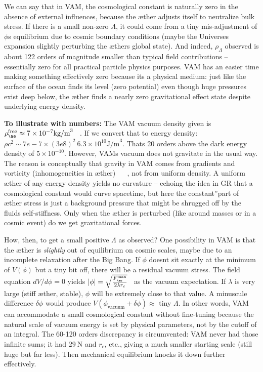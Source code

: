 \documentclass[a4paper, aps,preprint,superscriptaddress, 12pt]{revtex4}
\begin{document}
We can say that in VAM, the cosmological constant is naturally zero in the absence of external influences, because the æther adjusts itself to neutralize bulk stress. If there is a small non-zero $\Lambda$, it could come from a tiny mis-adjustment of $\phi$\rqs s equilibrium due to cosmic boundary conditions (maybe the Universe\rqs s expansion slightly perturbing the æther\rqs s global state). And indeed, $\rho_\Lambda$ observed is about 122 orders of magnitude smaller than typical field contributions – essentially zero for all practical particle physics purposes. VAM has an easier time making something effectively zero because it\rqs s a physical medium: just like the surface of the ocean finds its level (zero potential) even though huge pressures exist deep below, the æther finds a nearly zero gravitational effect state despite underlying energy density.


\textbf{To illustrate with numbers:} The VAM vacuum density given is $\rho_{\ae}^{\text{free}}\approx7\times10^{-7}\text{kg/m}^3$~\cite{VAM_constants} . If we convert that to energy density: $\rho c^2 \sim 7e-7 \times (3e8)^2 ~ 6.3\times10^{10}\text{J/m}^3$.
That\rqs s 20 orders above the dark energy density of $5\times10^{-10}$. However, VAM\rqs s vacuum does not gravitate in the usual way. The reason is conceptually that gravity in VAM comes from gradients and vorticity (inhomogeneities in æther)~\cite{Iskandarani2025c} ~\cite{Iskandarani2025c} , not from uniform density. A uniform æther of any energy density yields no curvature – echoing the idea in GR that a cosmological constant would curve spacetime, but here the \grqq constant\textquotedblright part of æther stress is just a background pressure that might be shrugged off by the fluid\rqs s self-stiffness. Only when the æther is perturbed (like around masses or in a cosmic event) do we get gravitational forces.


How, then, to get a small positive $\Lambda$ as observed? One possibility in VAM is that the æther is \textit{slightly} out of equilibrium on cosmic scales, maybe due to an incomplete relaxation after the Big Bang. If $\phi$ doesn\rqs t sit exactly at the minimum of $V(\phi)$ but a tiny bit off, there will be a residual vacuum stress. The field equation $dV/d\phi = 0$ yields $|\phi| = \sqrt{\frac{F_{\ae}^{\max}}{2\lambda r_c}}$~\cite{Iskandarani2025c}  as the vacuum expectation. If $\lambda$ is very large (stiff æther, stable), $\phi$ will be extremely close to that value. A minuscule difference $\delta\phi$ would produce $V(\phi_{\text{vacuum}}+\delta\phi) \approx$ tiny $\Lambda$. In other words, VAM can accommodate a small cosmological constant without fine-tuning because the natural scale of vacuum energy is set by physical parameters, not by the cutoff of an integral. The 60-120 orders discrepancy is circumvented: VAM never had those infinite sums; it had $29~\text{N}$ and $r_c$, etc., giving a much smaller starting scale (still huge but far less). Then mechanical equilibrium knocks it down further effectively.
\end{document}
